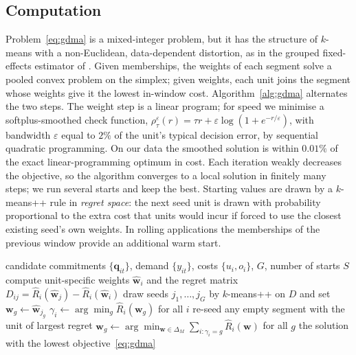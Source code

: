 \subsection{Computation}

Problem~\eqref{eq:gdma} is a mixed-integer problem, but it has the structure of $k$-means with a non-Euclidean, data-dependent distortion, as in the grouped fixed-effects estimator of \citet{BonhommeManresa2015}.
Given memberships, the weights of each segment solve a pooled convex problem on the simplex; given weights, each unit joins the segment whose weights give it the lowest in-window cost.
Algorithm~\ref{alg:gdma} alternates the two steps.
The weight step is a linear program; for speed we minimise a softplus-smoothed check function,
$\rho^\varepsilon_\tau(r)=\tau r+\varepsilon\log(1+e^{-r/\varepsilon})$, with bandwidth $\varepsilon$ equal to $2\%$ of the unit's typical decision error, by sequential quadratic programming.
On our data the smoothed solution is within $0.01\%$ of the exact linear-programming optimum in cost.
Each iteration weakly decreases the objective, so the algorithm converges to a local solution in finitely many steps; we run several starts and keep the best.
Starting values are drawn by a $k$-means++ rule \citep{ArthurVassilvitskii2007} in \emph{regret space}: the next seed unit is drawn with probability proportional to the extra cost that units would incur if forced to use the closest existing seed's own weights.
In rolling applications the memberships of the previous window provide an additional warm start.

\begin{algorithm}[t]
\caption{GDMA for a fixed number of segments $G$}\label{alg:gdma}
\begin{algorithmic}[1]
\Require candidate commitments $\{\bm q_{it}\}$, demand $\{y_{it}\}$, costs $\{u_i,o_i\}$, $G$, number of starts $S$
\State compute unit-specific weights $\widehat{\bm w}_i$ and the regret matrix $D_{ij}=\widehat R_i(\widehat{\bm w}_j)-\widehat R_i(\widehat{\bm w}_i)$
  \State draw seeds $j_1,\dots,j_G$ by $k$-means++ on $D$ and set $\bm w_g\gets\widehat{\bm w}_{j_g}$
  \Repeat
    \State $\gamma_i\gets\arg\min_g\widehat R_i(\bm w_g)$ for all $i$ 
    \State re-seed any empty segment with the unit of largest regret
    \State $\bm w_g\gets\arg\min_{\bm w\in\Delta_M}\sum_{i:\gamma_i=g}\widehat R_i(\bm w)$ for all $g$ 
\EndFor
\State \Return the solution with the lowest objective~\eqref{eq:gdma}
\end{algorithmic}
\end{algorithm}

